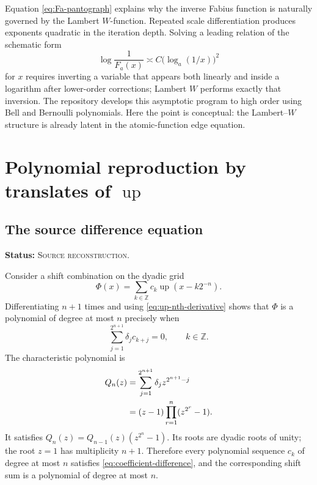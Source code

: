 \documentclass[11pt]{article}
\theoremstyle{definition}
\theoremstyle{remark}
\newcommand{\Up}{\operatorname{up}}
\newcommand{\Z}{\mathbb{Z}}
\newcommand{\SourceStatus}{\textcolor{SourceBlue}{\textsc{Source reconstruction}}}
\newcommand{\status}[1]{\par\smallskip\noindent\textbf{Status:} #1.\par\smallskip}
\begin{document}
Equation \eqref{eq:Fa-pantograph} explains why the inverse Fabius function is naturally governed by the Lambert \(W\)-function.  Repeated scale differentiation produces exponents quadratic in the iteration depth.  Solving a leading relation of the schematic form
\begin{equation}
  \log\frac1{F_a(x)}\asymp C\bigl(\log_a(1/x)\bigr)^2
  \label{eq:edge-log-square}
\end{equation}
for \(x\) requires inverting a variable that appears both linearly and inside a logarithm after lower-order corrections; Lambert \(W\) performs exactly that inversion.  The repository develops this asymptotic program to high order using Bell and Bernoulli polynomials.  Here the point is conceptual: the Lambert--\(W\) structure is already latent in the atomic-function edge equation.

\section{Polynomial reproduction by translates of \texorpdfstring{\(\Up\)}{up}}
\label{sec:polynomial-reproduction}

\subsection{The source difference equation}
\status{\SourceStatus}

Consider a shift combination on the dyadic grid
\begin{equation}
  \Phi(x)=\sum_{k\in\Z}c_k\Up(x-k2^{-n}).
  \label{eq:up-shift-combination}
\end{equation}
Differentiating \(n+1\) times and using \eqref{eq:up-nth-derivative} shows that \(\Phi\) is a polynomial of degree at most \(n\) precisely when
\begin{equation}
  \sum_{j=1}^{2^{n+1}}\delta_j c_{k+j}=0,
  \qquad k\in\Z.
  \label{eq:coefficient-difference}
\end{equation}
The characteristic polynomial is
\begin{align}
  Q_n(z)
   &=\sum_{j=1}^{2^{n+1}}\delta_j z^{2^{n+1}-j}
     \notag\\
   &=(z-1)\prod_{r=1}^{n}(z^{2^r}-1).
  \label{eq:Qn}
\end{align}
It satisfies \(Q_n(z)=Q_{n-1}(z)(z^{2^n}-1)\).  Its roots are dyadic roots of unity; the root \(z=1\) has multiplicity \(n+1\).  Therefore every polynomial sequence \(c_k\) of degree at most \(n\) satisfies \eqref{eq:coefficient-difference}, and the corresponding shift sum is a polynomial of degree at most \(n\).
\end{document}
